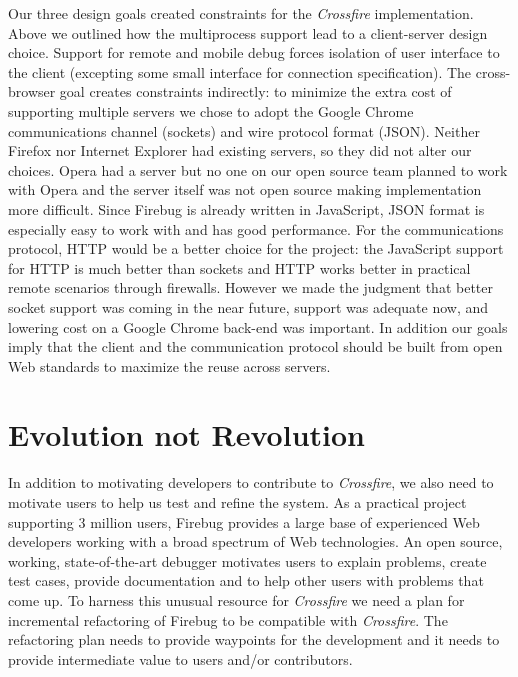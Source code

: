 Our three design goals created constraints for the \textit{Crossfire}
implementation. Above we outlined how the multiprocess support lead to a
client-server design choice. Support for remote and mobile debug forces
isolation of user interface to the client (excepting some small interface for
connection specification). The cross-browser goal creates constraints
indirectly: to minimize the extra cost of supporting multiple servers we chose
to adopt the Google Chrome communications channel (sockets) and wire protocol
format (JSON). Neither Firefox nor Internet Explorer had existing servers, so
they did not alter our choices. Opera had a server but no one on our open source
team planned to work with Opera and the server itself was not open source making
implementation more difficult.  Since Firebug is already written in JavaScript,
JSON format is especially easy to work with and has good performance\cite{json}.
 For the communications protocol, HTTP would be a better choice for the project:
the JavaScript support for HTTP is much better than sockets and HTTP works
better in practical remote scenarios through firewalls.  However we made the
judgment that better socket support was coming in the near
future\cite{websocketapi}, support was adequate now, and lowering cost on a
Google Chrome back-end was important.  In addition our goals imply that the
client and the communication protocol should be built from open Web standards to
maximize the reuse across servers.


\section{Evolution not Revolution}
In addition to motivating developers to contribute to \textit{Crossfire}, we
also need to motivate users to help us test and refine the system. As a
practical project supporting 3 million users, Firebug provides a large base of
experienced Web developers working with a broad spectrum of Web technologies. An
open source, working, state-of-the-art debugger motivates users to explain
problems, create test cases, provide documentation and to help other users with
problems that come up. To harness this
 unusual resource  for \textit{Crossfire} we need a plan for incremental
 refactoring of Firebug to be compatible
with \textit{Crossfire}.  The refactoring plan needs to provide waypoints for
the development and it needs to provide intermediate value to users and/or
contributors.


